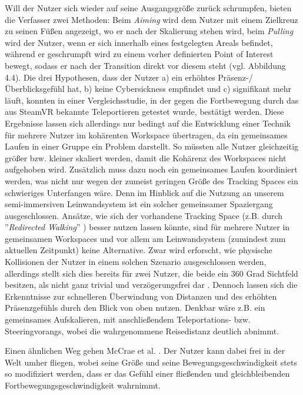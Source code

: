 Will der Nutzer sich wieder auf seine Ausgangsgröße zurück schrumpfen, bieten die Verfasser zwei Methoden: Beim \textit{Aiming} wird dem Nutzer mit einem Zielkreuz zu seinen Füßen angezeigt, wo er nach der Skalierung stehen wird, beim \textit{Pulling} wird der Nutzer, wenn er sich innerhalb eines festgelegten Areals befindet, während er geschrumpft wird zu einem vorher definierten Point of Interest bewegt, sodass er nach der Transition direkt vor diesem steht (vgl. Abbildung 4.4).
Die drei Hypothesen, dass der Nutzer a) ein erhöhtes Präsenz-/ Überblicksgefühl hat, b) keine Cybersickness empfindet und c) signifikant mehr läuft, konnten in einer Vergleichsstudie, in der gegen die Fortbewegung durch das aus SteamVR bekannte Teleportieren getestet wurde, bestätigt werden.
Diese Ergebnisse lassen sich allerdings nur bedingt auf die Entwicklung einer Technik für mehrere Nutzer im kohärenten Workspace übertragen, da ein gemeinsames Laufen in einer Gruppe ein Problem darstellt. So müssten alle Nutzer gleichzeitig größer bzw. kleiner skaliert werden, damit die Kohärenz des Workspaces nicht aufgehoben wird. Zusätzlich muss dazu noch ein gemeinsames Laufen koordiniert werden, was nicht nur wegen der zumeist geringen Größe des Tracking Spaces ein schwieriges Unterfangen wäre. Denn im Hinblick auf die Nutzung an unserem semi-immersiven Leinwandsystem ist ein solcher gemeinsamer Spaziergang ausgeschlossen. Ansätze, wie sich der vorhandene Tracking Space  (z.B. durch ”\textit{Redirected Walking}” \cite{RazzaqueRedirectedWalking}) besser nutzen lassen könnte, sind für mehrere Nutzer in gemeinsamen Workspaces und vor allem am Leinwandsystem (zumindest zum aktuellen Zeitpunkt) keine Alternative. Zwar wird erforscht, wie physische Kollisionen der Nutzer in einem solchen Szenario ausgeschlossen werden, allerdings stellt sich dies bereits für zwei Nutzer, die beide ein 360 Grad Sichtfeld besitzen, als nicht ganz trivial und verzögerungsfrei dar \cite{azmandian2017evaluation}.
Dennoch lassen sich die Erkenntnisse zur schnelleren Überwindung von Distanzen und des erhöhten Präsenzgefühls durch den Blick von oben nutzen. Denkbar wäre z.B. ein gemeinsames Aufskalieren, mit anschließendem Teleportations- bzw. Steeringvorangs, wobei die wahrgenommene Reisedistanz deutlich abnimmt.




Einen ähnlichen Weg gehen McCrae et al. \cite{McCrae2009MultiscaleNavigation}.
Der Nutzer kann dabei  frei in der Welt umher fliegen, wobei seine Größe und seine Bewegungsgeschwindigkeit stets so modifiziert werden, dass er das Gefühl einer fließenden und gleichbleibenden Fortbewegungsgeschwindigkeit wahrnimmt. 

